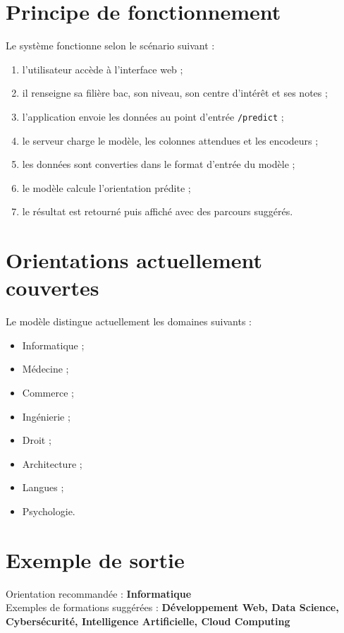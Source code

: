 \documentclass[12pt,a4paper]{report}
\begin{document}
\section{Principe de fonctionnement}
Le système fonctionne selon le scénario suivant :
\begin{enumerate}[label=\arabic*.]
    \item l'utilisateur accède à l'interface web ;
    \item il renseigne sa filière bac, son niveau, son centre d'intérêt et ses notes ;
    \item l'application envoie les données au point d'entrée \texttt{/predict} ;
    \item le serveur charge le modèle, les colonnes attendues et les encodeurs ;
    \item les données sont converties dans le format d'entrée du modèle ;
    \item le modèle calcule l'orientation prédite ;
    \item le résultat est retourné puis affiché avec des parcours suggérés.
\end{enumerate}

\section{Orientations actuellement couvertes}
Le modèle distingue actuellement les domaines suivants :
\begin{itemize}[label=--]
    \item Informatique ;
    \item Médecine ;
    \item Commerce ;
    \item Ingénierie ;
    \item Droit ;
    \item Architecture ;
    \item Langues ;
    \item Psychologie.
\end{itemize}

\section{Exemple de sortie}
\begin{mybox}
Orientation recommandée : \textbf{Informatique} \\[0.2cm]
Exemples de formations suggérées : \textbf{Développement Web, Data Science, Cybersécurité, Intelligence Artificielle, Cloud Computing}
\end{mybox}
\end{document}
